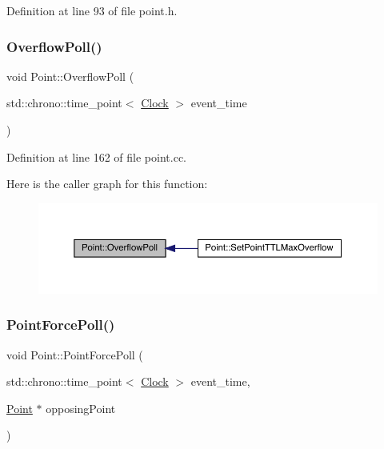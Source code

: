 Definition at line 93 of file point.\+h.

\mbox{\label{class_point_a44c69c43cfdcb3273d0e6786a21fd000}} 
\subsubsection{\texorpdfstring{Overflow\+Poll()}{OverflowPoll()}}
{\footnotesize\ttfamily void Point\+::\+Overflow\+Poll (\begin{DoxyParamCaption}\item[{std\+::chrono\+::time\+\_\+point$<$ \hyperlink{universe_8h_a0ef8d951d1ca5ab3cfaf7ab4c7a6fd80}{Clock} $>$}]{event\+\_\+time }\end{DoxyParamCaption})}



Definition at line 162 of file point.\+cc.

Here is the caller graph for this function\+:
\nopagebreak
\begin{figure}[H]
\begin{center}
\leavevmode
\includegraphics[width=350pt]{class_point_a44c69c43cfdcb3273d0e6786a21fd000_icgraph}
\end{center}
\end{figure}
\mbox{\label{class_point_a414f2215f758cd69fa67e8135ecc4fe2}} 
\subsubsection{\texorpdfstring{Point\+Force\+Poll()}{PointForcePoll()}}
{\footnotesize\ttfamily void Point\+::\+Point\+Force\+Poll (\begin{DoxyParamCaption}\item[{std\+::chrono\+::time\+\_\+point$<$ \hyperlink{universe_8h_a0ef8d951d1ca5ab3cfaf7ab4c7a6fd80}{Clock} $>$}]{event\+\_\+time,  }\item[{\hyperlink{class_point}{Point} $\ast$}]{opposing\+Point }\end{DoxyParamCaption})}



